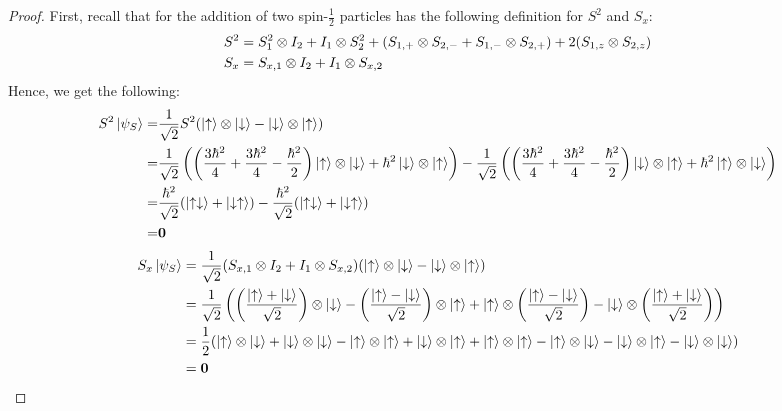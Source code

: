 \documentclass{article}
\begin{document}
\begin{proof}
    First, recall that for the addition of two spin-$\frac{1}{2}$ particles has the following definition for $S^2$ and $S_x$:
    \begin{align}
        &S^2 = S_1^2 \otimes I_2 + I_1 \otimes S_2^2 + (S_{1,+}\otimes S_{2,-}+S_{1,-}\otimes S_{2,+}) + 2(S_{1,z}\otimes S_{2,z})\\
        &S_x = S_{x,1}\otimes I_2 + I_1\otimes S_{x,2}
    \end{align}    
    Hence, we get the following:
    \begin{align}
        S^2\ket{\psi_S} =& \frac{1}{\sqrt{2}}S^2(\ket{\uparrow}\otimes\ket{\downarrow}-\ket{\downarrow}\otimes\ket{\uparrow})\\
        =& \frac{1}{\sqrt{2}}\left(\bigg(\frac{3\hbar^2}{4} + \frac{3\hbar^2}{4}-\frac{\hbar^2}{2}\bigg)\ket{\uparrow}\otimes\ket{\downarrow}+\hbar^2\ket{\downarrow}\otimes\ket{\uparrow}\right) - \frac{1}{\sqrt{2}}\left(\left(\frac{3\hbar^2}{4}+\frac{3\hbar^2}{4}-\frac{\hbar^2}{2}\right)\ket{\downarrow}\otimes\ket{\uparrow}+\hbar^2\ket{\uparrow}\otimes\ket{\downarrow}\right)\\
        =& \frac{\hbar^2}{\sqrt{2}}(\ket{\uparrow\downarrow}+\ket{\downarrow\uparrow})- \frac{\hbar^2}{\sqrt{2}}(\ket{\uparrow\downarrow}+\ket{\downarrow\uparrow})\\
        =& \mathbf{0}
    \end{align} 
    \begin{align}
        S_x\ket{\psi_S} &= \frac{1}{\sqrt{2}}(S_{x,1}\otimes I_2+I_1\otimes S_{x,2})(\ket{\uparrow}\otimes\ket{\downarrow}-\ket{\downarrow}\otimes\ket{\uparrow})\\
        &= \frac{1}{\sqrt{2}}\left(\left(\frac{\ket{\uparrow}+\ket{\downarrow}}{\sqrt{2}}\right)\otimes\ket{\downarrow} - \left(\frac{\ket{\uparrow}-\ket{\downarrow}}{\sqrt{2}}\right)\otimes\ket{\uparrow} + \ket{\uparrow}\otimes\left(\frac{\ket{\uparrow}-\ket{\downarrow}}{\sqrt{2}}\right)-\ket{\downarrow}\otimes\left(\frac{\ket{\uparrow}+\ket{\downarrow}}{\sqrt{2}}\right)\right)\\
        &= \frac{1}{2}(\ket{\uparrow}\otimes\ket{\downarrow}+\ket{\downarrow}\otimes\ket{\downarrow}-\ket{\uparrow}\otimes\ket{\uparrow}+\ket{\downarrow}\otimes\ket{\uparrow}+\ket{\uparrow}\otimes\ket{\uparrow}-\ket{\uparrow}\otimes\ket{\downarrow}-\ket{\downarrow}\otimes\ket{\uparrow}-\ket{\downarrow}\otimes\ket{\downarrow})\\
        &= \mathbf{0}
    \end{align}
\end{proof}
\end{document}
